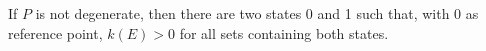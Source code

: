 If $P$ is not degenerate, then there are two states 0 and 1 such that, with 0 as reference point, $k(E) > 0$ for all sets containing both states.
